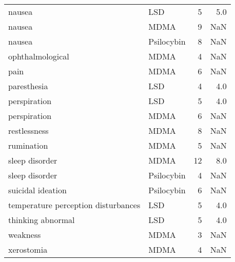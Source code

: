 \begin{tabular}{llrr}
                             nausea &        LSD &            5 &         5.0 \\
                             nausea &       MDMA &            9 &         NaN \\
                             nausea & Psilocybin &            8 &         NaN \\
                   ophthalmological &       MDMA &            4 &         NaN \\
                               pain &       MDMA &            6 &         NaN \\
                        paresthesia &        LSD &            4 &         4.0 \\
                       perspiration &        LSD &            5 &         4.0 \\
                       perspiration &       MDMA &            6 &         NaN \\
                       restlessness &       MDMA &            8 &         NaN \\
                         rumination &       MDMA &            5 &         NaN \\
                     sleep disorder &       MDMA &           12 &         8.0 \\
                     sleep disorder & Psilocybin &            4 &         NaN \\
                  suicidal ideation & Psilocybin &            6 &         NaN \\
temperature perception disturbances &        LSD &            5 &         4.0 \\
                  thinking abnormal &        LSD &            5 &         4.0 \\
                           weakness &       MDMA &            3 &         NaN \\
                         xerostomia &       MDMA &            4 &         NaN \\
\bottomrule
\end{tabular}
